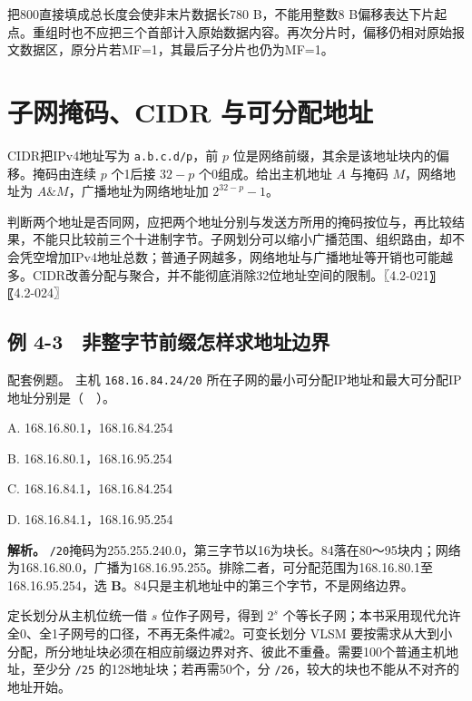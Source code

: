 把800直接填成总长度会使非末片数据长780 B，不能用整数8 B偏移表达下片起点。重组时也不应把三个首部计入原始数据内容。再次分片时，偏移仍相对原始报文数据区，原分片若MF=1，其最后子分片也仍为MF=1。

\section{子网掩码、CIDR 与可分配地址}\label{CN04-08}

CIDR把IPv4地址写为 \texttt{a.\allowbreak{}b.\allowbreak{}c.\allowbreak{}d/\allowbreak{}p}，前 \(p\) 位是网络前缀，其余是该地址块内的偏移。掩码由连续 \(p\) 个1后接 \(32-p\) 个0组成。给出主机地址 \(A\) 与掩码 \(M\)，网络地址为 \(A\&M\)，广播地址为网络地址加 \(2^{32-p}-1\)。

判断两个地址是否同网，应把两个地址分别与发送方所用的掩码按位与，再比较结果，不能只比较前三个十进制字节。子网划分可以缩小广播范围、组织路由，却不会凭空增加IPv4地址总数；普通子网越多，网络地址与广播地址等开销也可能越多。CIDR改善分配与聚合，并不能彻底消除32位地址空间的限制。〖4.2-021〗〖4.2-024〗

\subsection{例 4-3　非整字节前缀怎样求地址边界}\label{CN04-ex3}

\begin{example}[配套例题]

配套例题。 主机 \texttt{168.\allowbreak{}16.\allowbreak{}84.\allowbreak{}24/\allowbreak{}20} 所在子网的最小可分配IP地址和最大可分配IP地址分别是（　）。

A. 168.16.80.1，168.16.84.254

B. 168.16.80.1，168.16.95.254

C. 168.16.84.1，168.16.84.254

D. 168.16.84.1，168.16.95.254

\end{example}

\textbf{解析。} \texttt{/\allowbreak{}20}掩码为255.255.240.0，第三字节以16为块长。84落在80～95块内；网络为168.16.80.0，广播为168.16.95.255。排除二者，可分配范围为168.16.80.1至168.16.95.254，选 \textbf{B}。84只是主机地址中的第三个字节，不是网络边界。

定长划分从主机位统一借 \(s\) 位作子网号，得到 \(2^s\) 个等长子网；本书采用现代允许全0、全1子网号的口径，不再无条件减2。可变长划分 VLSM 要按需求从大到小分配，所分地址块必须在相应前缀边界对齐、彼此不重叠。需要100个普通主机地址，至少分 \texttt{/\allowbreak{}25} 的128地址块；若再需50个，分 \texttt{/\allowbreak{}26}，较大的块也不能从不对齐的地址开始。

